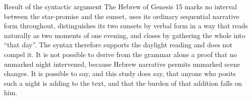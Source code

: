 \begin{studybox}{Result of the syntactic argument}
The Hebrew of Genesis 15 marks no interval between the star-promise and the
sunset, uses its ordinary sequential narrative form throughout, distinguishes
its two sunsets by verbal form in a way that reads naturally as two moments of
one evening, and closes by gathering the whole into ``that day''. The syntax
therefore supports the daylight reading and does not compel it. It is not
possible to derive from the grammar alone a proof that no unmarked night
intervened, because Hebrew narrative permits unmarked scene changes. It is
possible to say, and this study does say, that anyone who posits such a night is
adding to the text, and that the burden of that addition falls on him.
\end{studybox}
